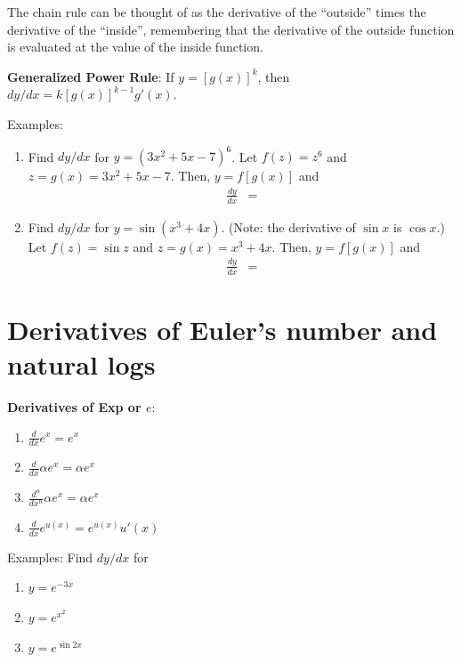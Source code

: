\documentclass[]{book}
\theoremstyle{definition}
\theoremstyle{definition}
\theoremstyle{definition}
\theoremstyle{remark}
\begin{document}
The chain rule can be thought of as the derivative of the ``outside''
times the derivative of the ``inside'', remembering that the derivative
of the outside function is evaluated at the value of the inside
function.

\textbf{Generalized Power Rule}: If \(y=[g(x)]^k\), then
\(dy/dx=k[g(x)]^{k-1}g'(x)\).

\begin{framed}
Examples:
\begin{enumerate}
        \item Find $dy/dx$ for $y=(3x^2+5x-7)^6$. Let $f(z)=z^6$ and $z=g(x)=3x^2+5x-7$.  Then, $y=f[g(x)]$ and
        \begin{eqnarray*}
            \frac{dy}{dx}&=
        \end{eqnarray*}
        
        \item Find $dy/dx$ for $y=\sin(x^3+4x)$. (Note: the derivative of $\sin x$ is $\cos x$.)  Let $f(z)=\sin z$ and $z=g(x)=x^3+4x$.  Then, $y=f[g(x)]$ and
        \begin{eqnarray*}
            \frac{dy}{dx}&=
        \end{eqnarray*}
\end{enumerate}
\end{framed}

\section{Derivatives of Euler's number and natural
logs}\label{derivatives-of-eulers-number-and-natural-logs}

\textbf{Derivatives of Exp or \(e\)}:

\begin{enumerate}
        \item $\frac{d}{dx}e^x = e^x$
        \item $\frac{d}{dx}\alpha e^x = \alpha e^x$
        \item $\frac{d^n}{dx^n} \alpha e^x = \alpha e^x$
        \item $\frac{d}{dx}e^{u(x)}= e^{u(x)} u'(x)$
\end{enumerate}

Examples: Find \(dy/dx\) for

\begin{enumerate}
        \item \parbox[t]{1.5in}{$y=e^{-3x}$}\parbox[t]{4in}{} 
        \item \parbox[t]{1.5in}{$y=e^{x^2}$}\parbox[t]{4in}{} 
        \item \parbox[t]{1.5in}{$y=e^{\sin 2x}$}\parbox[t]{4in}{} 
\end{enumerate}
\end{document}
